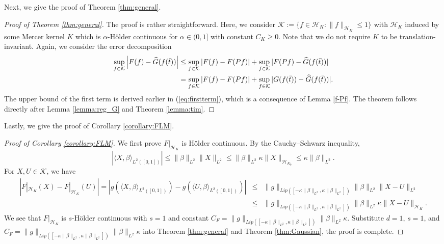 \documentclass{article}
\numberwithin{equation}{section}
\begin{document}
\begin{appendices}
Next, we give the proof of Theorem \ref{thm:general}.
\begin{proof}[Proof of Theorem \ref{thm:general}]
    The proof is rather straightforward. Here, we consider  $
    \mathcal{K} := \{f\in \mathcal{H}_K: \|f\|_{\mathcal{H}_K} \leq 1\}
$ with $\mathcal{H}_K$ induced by some Mercer kernel $K$ which is $\alpha$-H\"{o}lder continuous for $\alpha \in (0, 1]$ with constant $C_K \geq 0$. Note that we do not require $K$ to be translation-invariant. Again, we consider the error decomposition 
        \begin{eqnarray*}
         \sup_{f\in \mathcal{K}}\left| F(f) - \widehat{G}(f(\Bar{t}))\right| &\leq  \sup_{f\in \mathcal{K}}| F(f) - F(Pf)| +  \sup_{f\in \mathcal{K}}|F(Pf) - \widehat{G}(f(\Bar{t}))| \\
        &=  \sup_{f\in \mathcal{K}}| F(f) - F(Pf)| +  \sup_{f\in \mathcal{K}}|G(f(\Bar{t})) - \widehat{G}(f(\Bar{t}))|.
    \end{eqnarray*}
    The upper bound of the first term is derived earlier in (\ref{eq:firstterm}), which is a consequence of Lemma \ref{f-Pf}. 
    The theorem follows directly after Lemma \ref{lemma:reg_G} and  Theorem \ref{lemma:tim}.
\end{proof}

Lastly, we give the proof of Corollary \ref{corollary:FLM}. 
\begin{proof}[Proof of Corollary \ref{corollary:FLM}]
 We first prove $F|_{\mathcal{H}_K}$ is H\"{o}lder continuous.
 By the Cauchy–Schwarz inequality,
$$|\langle X, \beta \rangle_{L^2([0,1])}| \leq \|\beta\|_{L^2}  \|X\|_{L^2}\leq \|\beta\|_{L^2}\kappa  \|X\|_{\mathcal{H}_{K_0}} \leq \kappa \|\beta\|_{L^2}.$$
For $X, U \in \mathcal{K}$, we have 
 \begin{eqnarray*}
    \left |F|_{\mathcal{H}_K} (X) - F|_{\mathcal{H}_K} (U)\right| 
     = \left|g\left(\langle X, \beta \rangle_{L^2([0,1])}\right) - g\left(\langle U, \beta \rangle_{L^2([0,1])}\right)\right|
     &\leq&\|g\|_{Lip([-\kappa \|\beta\|_{L^2}, \kappa \|\beta\|_{L^2}])}\|\beta\|_{L^2} \|X-U\|_{L^2}\\
     &\leq& \|g\|_{Lip([-\kappa \|\beta\|_{L^2}, \kappa \|\beta\|_{L^2}])} \|\beta\|_{L^2}\kappa  \|X-U\|_{\mathcal{H}_K}.
 \end{eqnarray*}
 We see that $F|_{\mathcal{H}_K}$ is $s$-H\"{o}lder continuous with $s=1$ and constant $C_F = \|g\|_{Lip([-\kappa \|\beta\|_{L^2}, \kappa \|\beta\|_{L^2}])} \|\beta\|_{L^2}\kappa$.
 Substitute $d=1$, $s=1$, and $C_F = \|g\|_{Lip([-\kappa \|\beta\|_{L^2}, \kappa \|\beta\|_{L^2}])} \|\beta\|_{L^2}\kappa$ into Theorem \ref{thm:general} and Theorem \ref{thm:Gaussian}, the proof is complete. 
 \end{proof}
\end{appendices}    



%
\small

\end{document}
